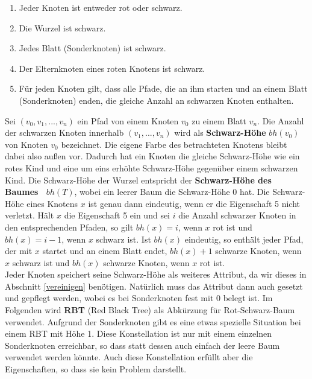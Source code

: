 \documentclass[a4paper,12pt]{article}
\begin{document}
\begin{enumerate}
	\item Jeder Knoten ist entweder rot oder schwarz.
	\item Die Wurzel ist schwarz.
	\item Jedes Blatt (Sonderknoten) ist schwarz.
	\item Der Elternknoten eines roten Knotens ist schwarz.
	\item Für jeden Knoten gilt, dass alle Pfade, die an ihm starten und an einem Blatt (Sonderknoten) enden, die gleiche Anzahl an schwarzen Knoten enthalten. 
\end{enumerate}  
Sei $(v_0,v_1,...,v_n)$ ein Pfad von einem Knoten $v_0$ zu einem Blatt $v_n$. Die Anzahl der schwarzen Knoten innerhalb $(v_1,...,v_n)$ wird als \textbf{Schwarz-Höhe} $\mathit{bh(v_0)}$ von Knoten $v_0$ bezeichnet. Die eigene Farbe des betrachteten Knotens bleibt dabei also außen vor. Dadurch hat ein Knoten die gleiche Schwarz-Höhe wie ein rotes Kind und eine um eins erhöhte Schwarz-Höhe gegenüber einem schwarzen Kind. Die Schwarz-Höhe der Wurzel entspricht der \textbf{Schwarz-Höhe des Baumes~ $bh(T)$}, wobei ein leerer Baum die Schwarz-Höhe $0$ hat. Die Schwarz-Höhe eines Knotens $x$ ist genau dann eindeutig, wenn er die Eigenschaft 5 nicht verletzt. Hält $x$ die Eigenschaft 5 ein und sei $i$ die Anzahl schwarzer Knoten in den entsprechenden Pfaden, so gilt $\mathit{bh(x)} = i$, wenn $x$ rot ist und $\mathit{bh(x)} = i - 1$, wenn $x$ schwarz ist. Ist $\mathit{bh(x)}$ eindeutig, so enthält jeder Pfad, der mit $x$ startet und an einem Blatt endet, $\mathit{bh(x)} + 1$ schwarze Knoten, wenn $x$ schwarz ist und  $\mathit{bh(x)}$ schwarze Knoten, wenn $x$ rot ist.\\ Jeder Knoten speichert seine Schwarz-Höhe als weiteres Attribut, da wir dieses in Abschnitt \ref{vereinigen} benötigen. Natürlich muss das Attribut dann auch gesetzt und gepflegt werden, wobei es bei Sonderknoten fest mit $0$ belegt ist. Im Folgenden wird \textbf{RBT} (Red Black Tree) als Abkürzung für Rot-Schwarz-Baum verwendet. Aufgrund der Sonderknoten gibt es eine etwas spezielle Situation bei einem RBT mit Höhe 1. Diese Konstellation ist nur mit einem einzelnen Sonderknoten erreichbar, so dass statt dessen auch einfach der leere Baum verwendet werden könnte. Auch diese Konstellation erfüllt aber die Eigenschaften, so dass sie kein Problem darstellt. \\
\end{document}
